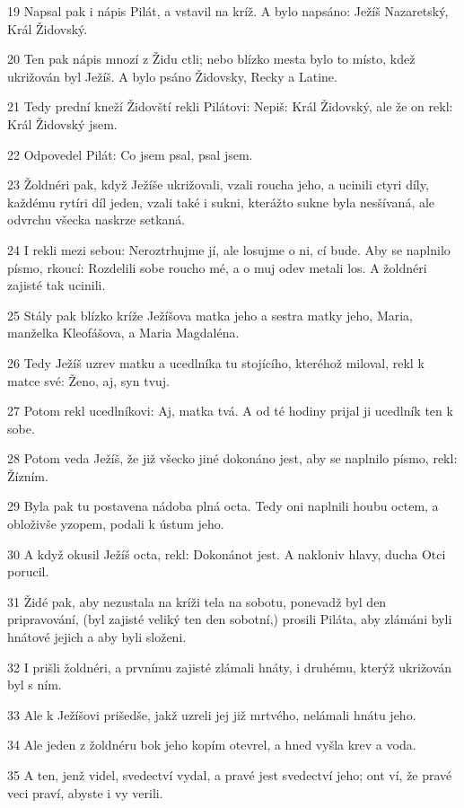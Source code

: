 \par 19 Napsal pak i nápis Pilát, a vstavil na kríž. A bylo napsáno: Ježíš Nazaretský, Král Židovský.
\par 20 Ten pak nápis mnozí z Židu ctli; nebo blízko mesta bylo to místo, kdež ukrižován byl Ježíš. A bylo psáno Židovsky, Recky a Latine.
\par 21 Tedy prední kneží Židovští rekli Pilátovi: Nepiš: Král Židovský, ale že on rekl: Král Židovský jsem.
\par 22 Odpovedel Pilát: Co jsem psal, psal jsem.
\par 23 Žoldnéri pak, když Ježíše ukrižovali, vzali roucha jeho, a ucinili ctyri díly, každému rytíri díl jeden, vzali také i sukni, kterážto sukne byla nesšívaná, ale odvrchu všecka naskrze setkaná.
\par 24 I rekli mezi sebou: Neroztrhujme jí, ale losujme o ni, cí bude. Aby se naplnilo písmo, rkoucí: Rozdelili sobe roucho mé, a o muj odev metali los. A žoldnéri zajisté tak ucinili.
\par 25 Stály pak blízko kríže Ježíšova matka jeho a sestra matky jeho, Maria, manželka Kleofášova, a Maria Magdaléna.
\par 26 Tedy Ježíš uzrev matku a ucedlníka tu stojícího, kteréhož miloval, rekl k matce své: Ženo, aj, syn tvuj.
\par 27 Potom rekl ucedlníkovi: Aj, matka tvá. A od té hodiny prijal ji ucedlník ten k sobe.
\par 28 Potom veda Ježíš, že již všecko jiné dokonáno jest, aby se naplnilo písmo, rekl: Žízním.
\par 29 Byla pak tu postavena nádoba plná octa. Tedy oni naplnili houbu octem, a obloživše yzopem, podali k ústum jeho.
\par 30 A když okusil Ježíš octa, rekl: Dokonánot jest. A nakloniv hlavy, ducha Otci porucil.
\par 31 Židé pak, aby nezustala na kríži tela na sobotu, ponevadž byl den pripravování, (byl zajisté veliký ten den sobotní,) prosili Piláta, aby zlámáni byli hnátové jejich a aby byli složeni.
\par 32 I prišli žoldnéri, a prvnímu zajisté zlámali hnáty, i druhému, kterýž ukrižován byl s ním.
\par 33 Ale k Ježíšovi prišedše, jakž uzreli jej již mrtvého, nelámali hnátu jeho.
\par 34 Ale jeden z žoldnéru bok jeho kopím otevrel, a hned vyšla krev a voda.
\par 35 A ten, jenž videl, svedectví vydal, a pravé jest svedectví jeho; ont ví, že pravé veci praví, abyste i vy verili.
